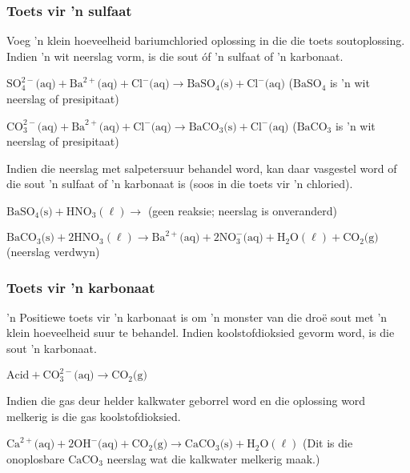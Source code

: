 \subsubsection*{Toets vir 'n sulfaat}
\nopagebreak
Voeg 'n klein hoeveelheid bariumchloried oplossing in die die toets soutoplossing.  Indien 'n wit neerslag vorm, is die sout óf 'n sulfaat of 'n karbonaat.\par 
$\text{SO}_{4}^{2-} \text{(aq)} + {\text{Ba}}^{2+} \text{(aq)} + {\text{Cl}}^{-} \text{(aq)} \to {\text{BaSO}}_{4} \text{(s)} + {\text{Cl}}^{-} \text{(aq)} $ (${\text{BaSO}}_{4}$ is 'n wit neerslag of presipitaat)\par 
$\text{CO}_{3}^{2-} \text{(aq)} + {\text{Ba}}^{2+} \text{(aq)} + {\text{Cl}}^{-} \text{(aq)} \to {\text{BaCO}}_{3} \text{(s)} + {\text{Cl}}^{-} \text{(aq)} $ (${\text{BaCO}}_{3}$ is 'n wit neerslag of presipitaat)\par 
Indien die neerslag met salpetersuur behandel word, kan daar vasgestel word of die sout 'n sulfaat of 'n karbonaat is (soos in die toets vir 'n chloried).\par 
${\text{BaSO}}_{4} \text{(s)} + {\text{HNO}}_{3} (\ell) \to $ (geen reaksie; neerslag is onveranderd)\par 
${\text{BaCO}}_{3} \text{(s)} + 2{\text{HNO}}_{3} (\ell) \to \text{Ba}^{2+} \text{(aq)} + 2\text{NO}_{3}^{-} \text{(aq)} + {\text{H}}_{2}\text{O} (\ell) + {\text{CO}}_{2} \text{(g)} $ (neerslag verdwyn)\par 

\subsubsection*{Toets vir 'n karbonaat}
\nopagebreak
 'n Positiewe toets vir 'n karbonaat is om 'n monster van die droë sout met 'n klein hoeveelheid suur te behandel. Indien koolstofdioksied gevorm word, is die sout  'n karbonaat.\par 
$\text{Acid} + \text{CO}_{3}^{2-} \text{(aq)} \to {\text{CO}}_{2} \text{(g)} $\par 
Indien die gas deur helder kalkwater geborrel word en die oplossing word melkerig is die gas koolstofdioksied.\par 
${\text{Ca}^{2+}} \text{(aq)} + 2\text{OH}^{-} \text{(aq)} + {\text{CO}}_{2} \text{(g)} \to {\text{CaCO}}_{3} \text{(s)} + \text{H}_{2}\text{O} (\ell) $ (Dit is die onoplosbare ${\text{CaCO}}_{3}$ neerslag wat die kalkwater melkerig maak.)\par 


